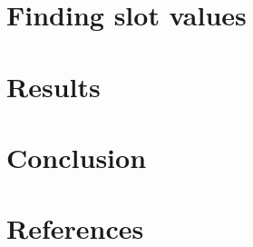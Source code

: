 \documentclass[letterpaper]{article}
\begin{document}
\section{Finding slot values}

\section{Results}

\section{Conclusion}

\section{References}

%
%

%
\end{document}
